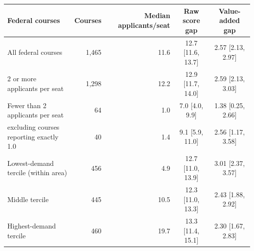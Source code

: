 \begin{tabular}{lrrcc}
\toprule
Federal courses & Courses & Median applicants/seat & Raw score gap & Value-added gap \\
\midrule
All federal courses & 1{,}465 & 11.6 & 12.7 [11.6, 13.7] & 2.57 [2.13, 2.97] \\
2 or more applicants per seat & 1{,}298 & 12.2 & 12.9 [11.7, 14.0] & 2.59 [2.13, 3.03] \\
Fewer than 2 applicants per seat & 64 & 1.0 & 7.0 [4.0, 9.9] & 1.38 [0.25, 2.66] \\
\quad excluding courses reporting exactly 1.0 & 40 & 1.4 & 9.1 [5.9, 11.0] & 2.56 [1.17, 3.58] \\
Lowest-demand tercile (within area) & 456 & 4.9 & 12.7 [11.0, 13.9] & 3.01 [2.37, 3.57] \\
Middle tercile & 445 & 10.5 & 12.3 [11.0, 13.3] & 2.43 [1.88, 2.92] \\
Highest-demand tercile & 460 & 19.7 & 13.3 [11.4, 15.1] & 2.30 [1.67, 2.83] \\
\bottomrule
\end{tabular}